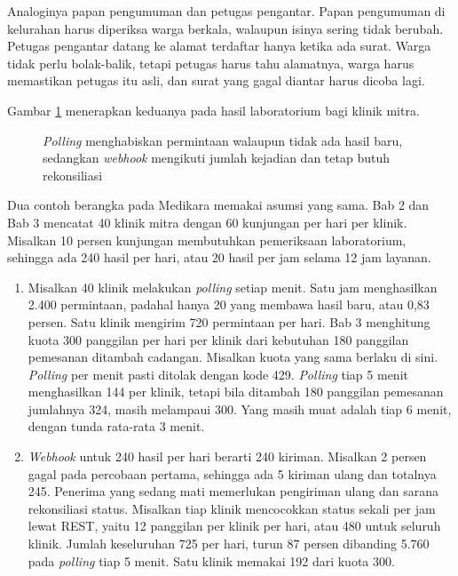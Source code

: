 Analoginya papan pengumuman dan petugas pengantar. Papan pengumuman di kelurahan harus diperiksa warga berkala, walaupun isinya
sering tidak berubah. Petugas pengantar datang ke alamat terdaftar hanya ketika ada surat. Warga tidak perlu bolak-balik, tetapi
petugas harus tahu alamatnya, warga harus memastikan petugas itu asli, dan surat yang gagal diantar harus dicoba lagi.

Gambar \ref{fig:ch05-polling-webhook} menerapkan keduanya pada hasil laboratorium bagi klinik mitra.

\begin{figure}[!htb]
  \centering
  
  \caption{\textit{Polling} menghabiskan permintaan walaupun tidak ada hasil baru, sedangkan \textit{webhook} mengikuti jumlah kejadian dan tetap butuh rekonsiliasi}
  \label{fig:ch05-polling-webhook}
\end{figure}

Dua contoh berangka pada Medikara memakai asumsi yang sama. Bab 2 dan Bab 3 mencatat 40 klinik mitra dengan 60 kunjungan per hari per
klinik. Misalkan 10 persen kunjungan membutuhkan pemeriksaan laboratorium, sehingga ada 240 hasil per hari, atau 20 hasil per
jam selama 12 jam layanan.
\begin{enumerate}
  \item Misalkan 40 klinik melakukan \textit{polling} setiap menit. Satu jam menghasilkan 2.400 permintaan, padahal hanya 20 yang
        membawa hasil baru, atau 0,83 persen. Satu klinik mengirim 720 permintaan per hari. Bab 3 menghitung kuota 300 panggilan
        per hari per klinik dari kebutuhan 180 panggilan pemesanan ditambah cadangan. Misalkan kuota yang sama berlaku di sini.
        \textit{Polling} per menit pasti ditolak dengan kode 429. \textit{Polling} tiap 5 menit menghasilkan 144 per klinik,
        tetapi bila ditambah 180 panggilan pemesanan jumlahnya 324, masih melampaui 300. Yang masih muat adalah tiap 6 menit,
        dengan tunda rata-rata 3 menit.
  \item \textit{Webhook} untuk 240 hasil per hari berarti 240 kiriman. Misalkan 2 persen gagal pada percobaan pertama, sehingga ada
        5 kiriman ulang dan totalnya 245. Penerima yang sedang mati memerlukan pengiriman ulang dan sarana rekonsiliasi status.
        Misalkan tiap klinik mencocokkan status sekali per jam lewat REST, yaitu 12 panggilan per klinik per hari, atau 480 untuk
        seluruh klinik. Jumlah keseluruhan 725 per hari, turun 87 persen dibanding 5.760 pada \textit{polling} tiap 5 menit.
        Satu klinik memakai 192 dari kuota 300.
\end{enumerate}

